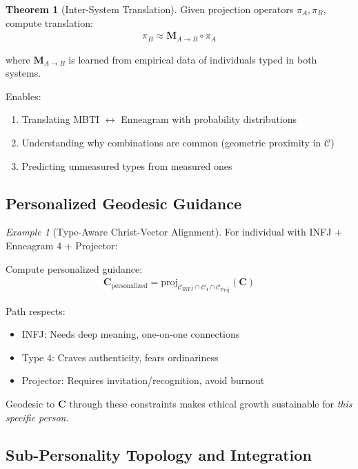 \documentclass[11pt,a4paper]{article}
\theoremstyle{definition}
\newtheorem{theorem}{Theorem}[section]
\theoremstyle{remark}
\newtheorem{example}{Example}[section]
\newcommand{\CC}{\mathcal{C}}
\begin{document}
\begin{theorem}[Inter-System Translation]
Given projection operators \(\pi_A, \pi_B\), compute translation:
\begin{align}
\pi_B \approx \mathbf{M}_{A \to B} \circ \pi_A
\end{align}

where \(\mathbf{M}_{A \to B}\) is learned from empirical data of individuals typed in both systems.

Enables:
\begin{enumerate}
\item Translating MBTI $\leftrightarrow$ Enneagram with probability distributions
\item Understanding why combinations are common (geometric proximity in \(\CC\))
\item Predicting unmeasured types from measured ones
\end{enumerate}
\end{theorem}

\subsection{Personalized Geodesic Guidance}

\begin{example}[Type-Aware Christ-Vector Alignment]
For individual with INFJ + Enneagram 4 + Projector:

Compute personalized guidance:
\begin{align}
\mathbf{C}_{\text{personalized}} = \text{proj}_{\CC_{\text{INFJ}} \cap \CC_{\text{4}} \cap \CC_{\text{Proj}}}(\mathbf{C})
\end{align}

Path respects:
\begin{itemize}
\item INFJ: Needs deep meaning, one-on-one connections
\item Type 4: Craves authenticity, fears ordinariness
\item Projector: Requires invitation/recognition, avoid burnout
\end{itemize}

Geodesic to \(\mathbf{C}\) through these constraints makes ethical growth sustainable for \textit{this specific person}.
\end{example}

\subsection{Sub-Personality Topology and Integration}
\end{document}
